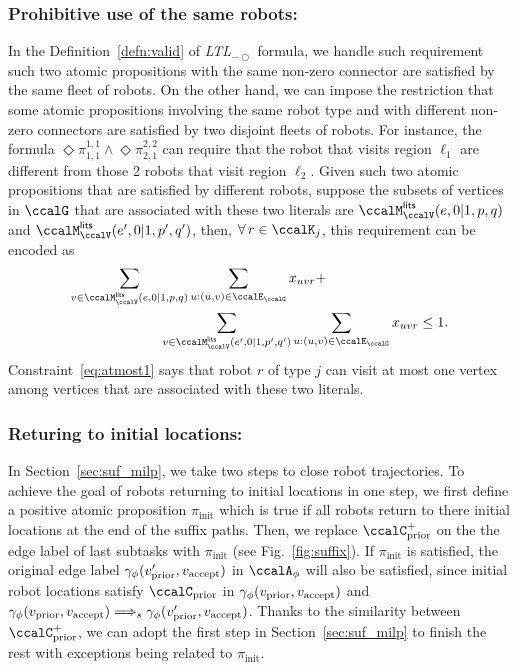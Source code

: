 \documentclass[Afour,sageh,times]{sagej}
\newcommand{\ltl}{ {\it LTL}$_{-\bigcirc}$ }
\newcommand{\autop}{\ccalA_{\phi}}
\newcommand{\vertex}[1]{v_{\textup{#1}}}
\newcommand{\simplies}{\DOTSB\Longrightarrow}
\renewcommand{\ap}[3]{\mathcal{\pi}_{{#1},{#2}}^{#3}}
\begin{document}
{{\subsubsection{Prohibitive use of the same robots:} In the Definition~\ref{defn:valid} of \ltl formula, we handle such requirement such two atomic propositions with the same non-zero connector are satisfied by the same fleet of robots. On the other hand, we can impose the restriction that some atomic propositions involving the same robot type and with different non-zero connectors are satisfied by two disjoint fleets of robots. For instance, the formula $\Diamond \ap{1}{1}{1,1} \wedge \Diamond \ap{2}{1}{2,2}$ can require that the robot that visits region $\ell_1$ are different from those 2 robots that visit region $\ell_2$. Given such two atomic propositions that are satisfied by different robots, suppose the subsets of vertices in $\ccalG$ that are associated with these two literals are $\ccalM_{\ccalV}^\mathsf{lits} (e, 0|1, p, q)$ and $\ccalM_{\ccalV}^\mathsf{lits} (e', 0|1, p', q')$, then, $\forall \, r \in \ccalK_j$, this requirement can be encoded as
\begin{align}\label{eq:atmost1}
  \sum_{v\in \ccalM_{\ccalV}^\mathsf{lits} (e, 0|1, p, q)} & \sum_{u: (u,v) \in \ccalE_\ccalG} x_{uvr} + \nonumber \\
 & \hspace{-2em}  \sum_{v\in \ccalM_{\ccalV}^\mathsf{lits} (e', 0|1, p', q')} \sum_{u: (u,v) \in \ccalE_\ccalG}  x_{uvr} \leq 1.
\end{align}
Constraint~\eqref{eq:atmost1} says that robot $r$ of type $j$ can visit at most one vertex among vertices that are associated with these two literals.


\subsubsection{Returing to initial locations:}\label{app:loop}
In Section~\ref{sec:suf_milp}, we take two steps to close robot trajectories. To achieve the goal of robots returning to initial locations in one step, we first define a positive atomic proposition $\pi_{\text{init}}$ which is true if all robots return to there initial locations at the end of the suffix paths. Then, we replace $\ccalC_{\text{prior}}^+$ on the the edge label of last subtasks with $\pi_{\text{init}}$ (see Fig.~\ref{fig:suffix}). If $\pi_{\text{init}}$ is satisfied, the original edge label $ \gamma_\phi(\vertex{prior}', \vertex{accept})$ in $\autop$ will also be satisfied, since initial robot locations satisfy $\ccalC_{\text{prior}}$ in $\gamma_\phi(\vertex{prior}, \vertex{accept})$ and $\gamma_\phi(\vertex{prior}, \vertex{accept}) \simplies_s \gamma_\phi(\vertex{prior}', \vertex{accept})$. Thanks to the similarity between $\ccalC_{\text{prior}}^+$, we can adopt the first step in Section~\ref{sec:suf_milp} to finish the rest with exceptions being related to $\pi_{\text{init}}$.

}}
\end{document}
